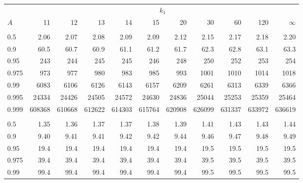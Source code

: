 \documentclass[]{article}
\begin{document}
\begin{table}[H]
\centering
\begin{tabular}{lrrrrrrrrrr}
\toprule
\multicolumn{1}{c}{ } & \multicolumn{10}{c}{$k_1$} \\
\cmidrule(l{3pt}r{3pt}){2-11}
\hspace{1.1em}$A$ & 11 & 12 & 13 & 14 & 15 & 20 & 30 & 60 & 120 & $\infty$\\
\midrule
\addlinespace[0.3em]
\multicolumn{11}{l}{\textbf{$k_2=1$}}\\
\hspace{1em}0.5 & 2.06 & 2.07 & 2.08 & 2.09 & 2.09 & 2.12 & 2.15 & 2.17 & 2.18 & 2.20\\
\hspace{1em}0.9 & 60.5 & 60.7 & 60.9 & 61.1 & 61.2 & 61.7 & 62.3 & 62.8 & 63.1 & 63.3\\
\hspace{1em}0.95 & 243 & 244 & 245 & 245 & 246 & 248 & 250 & 252 & 253 & 254\\
\hspace{1em}0.975 & 973 & 977 & 980 & 983 & 985 & 993 & 1001 & 1010 & 1014 & 1018\\
\hspace{1em}0.99 & 6083 & 6106 & 6126 & 6143 & 6157 & 6209 & 6261 & 6313 & 6339 & 6366\\
\hspace{1em}0.995 & 24334 & 24426 & 24505 & 24572 & 24630 & 24836 & 25044 & 25253 & 25359 & 25464\\
\hspace{1em}0.999 & 608368 & 610668 & 612622 & 614303 & 615764 & 620908 & 626099 & 631337 & 633972 & 636619\\
\addlinespace[0.3em]
\multicolumn{11}{l}{\textbf{$k_2=2$}}\\
\hspace{1em}0.5 & 1.35 & 1.36 & 1.37 & 1.37 & 1.38 & 1.39 & 1.41 & 1.43 & 1.43 & 1.44\\
\hspace{1em}0.9 & 9.40 & 9.41 & 9.41 & 9.42 & 9.42 & 9.44 & 9.46 & 9.47 & 9.48 & 9.49\\
\hspace{1em}0.95 & 19.4 & 19.4 & 19.4 & 19.4 & 19.4 & 19.4 & 19.5 & 19.5 & 19.5 & 19.5\\
\hspace{1em}0.975 & 39.4 & 39.4 & 39.4 & 39.4 & 39.4 & 39.4 & 39.5 & 39.5 & 39.5 & 39.5\\
\hspace{1em}0.99 & 99.4 & 99.4 & 99.4 & 99.4 & 99.4 & 99.4 & 99.5 & 99.5 & 99.5 & 99.5\\

\end{tabular}
\end{table}
\end{document}
